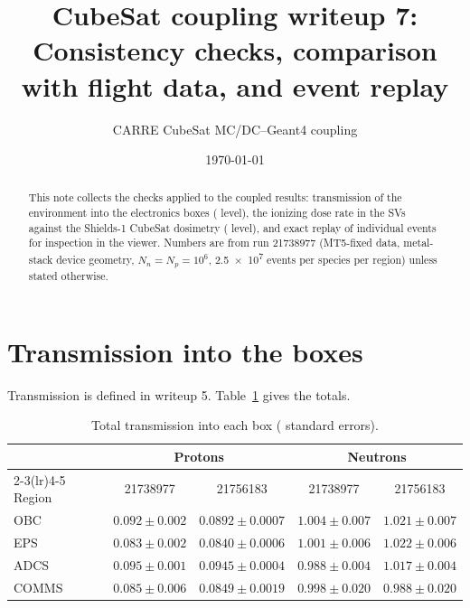 

\title{CubeSat coupling writeup 7:\\Consistency checks, comparison with flight data, and event replay}
\author{CARRE CubeSat MC/DC--Geant4 coupling}
\date{\today}


\maketitle

\begin{abstract}
This note collects the checks applied to the coupled results: transmission of the environment into the electronics boxes (\mcdc{} level), the ionizing dose rate in the SVs against the Shields-1 CubeSat dosimetry (\gfour{} level), and exact replay of individual \gfour{} events for inspection in the viewer. Numbers are from run 21738977 (MT5-fixed data, metal-stack device geometry, $N_n=N_p=10^6$, \num{2.5e7} \gfour{} events per species per region) unless stated otherwise.
\end{abstract}

\section{Transmission into the boxes}
Transmission is defined in writeup 5. Table~\ref{tab:trans} gives the totals.

\begin{table}[h]
\centering
\caption{Total transmission into each box (\mcdc{} standard errors).}
\label{tab:trans}
\begin{tabular}{lcccc}
\toprule
 & \multicolumn{2}{c}{Protons} & \multicolumn{2}{c}{Neutrons} \\
\cmidrule(lr){2-3}\cmidrule(lr){4-5}
Region & 21738977 & 21756183 & 21738977 & 21756183 \\
\midrule
OBC   & $0.092\pm0.002$ & $0.0892\pm0.0007$ & $1.004\pm0.007$ & $1.021\pm0.007$ \\
EPS   & $0.083\pm0.002$ & $0.0840\pm0.0006$ & $1.001\pm0.006$ & $1.022\pm0.006$ \\
ADCS  & $0.095\pm0.001$ & $0.0945\pm0.0004$ & $0.988\pm0.004$ & $1.017\pm0.004$ \\
COMMS & $0.085\pm0.006$ & $0.0849\pm0.0019$ & $0.998\pm0.020$ & $0.988\pm0.020$ \\
\bottomrule
\end{tabular}
\end{table}

